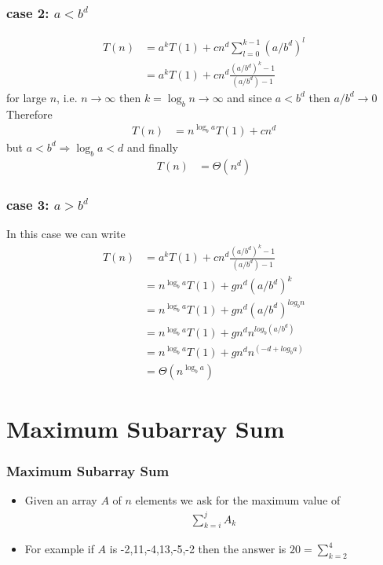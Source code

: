 \documentclass{beamer}
\begin{document}
\begin{frame}
  \frametitle{case 2: $a<b^d$}
   \begin{align*}
    T(n)&=a^kT(1)+cn^d\sum_{l=0}^{k-1}(a/b^d)^l\\
        &=a^kT(1)+cn^d\frac{(a/b^d)^k-1}{(a/b^d)-1}
  \end{align*}
for large $n$, i.e. $n\rightarrow\infty$ then $k=\log_b
n\rightarrow\infty$ and since $a<b^d$ then $a/b^d\rightarrow 0$
Therefore
 \begin{align*}
    T(n)&=n^{\log_b a}T(1)+cn^d
  \end{align*}
but $a< b^d\Rightarrow \log_b a <d$ and finally
\begin{align*}
    T(n)&=\Theta(n^d)
  \end{align*}
\end{frame}
\begin{frame}
  \frametitle{case 3: $a>b^d$}
  In this case we can write
 \begin{align*}
    T(n)&=a^kT(1)+cn^d\frac{(a/b^d)^k-1}{(a/b^d)-1}\\
        &=n^{\log_b a}T(1)+gn^d(a/b^d)^k\\
        &=n^{\log_b a}T(1)+gn^d(a/b^d)^{log_b n}\\
        &=n^{\log_b a}T(1)+gn^dn^{log_b (a/b^d)}\\
        &=n^{\log_b a}T(1)+gn^dn^{(-d+log_b a)}\\
        &=\Theta(n^{\log_b a})
  \end{align*}
\end{frame}

\section{Maximum Subarray Sum}
\begin{frame}
  \frametitle{Maximum Subarray Sum}
  \begin{itemize}
  \item Given an array $A$ of $n$ elements we ask for the maximum
    value of
    \begin{align*}
 \sum_{k=i}^{j}A_k
    \end{align*}

\item For example if $A$ is -2,11,-4,13,-5,-2 then the answer is  $20=\sum_{k=2}^4$
  \end{itemize}
\end{frame}
\end{document}
